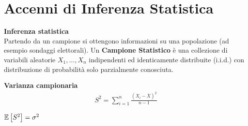 \section{Accenni di Inferenza Statistica}

\begin{defn}
    \textbf{Inferenza statistica} \\
    Partendo da un campione si ottengono informazioni su una popolazione (ad
    esempio sondaggi elettorali). Un \textbf{Campione Statistico} è una
    collezione di variabili aleatorie $X_1, \hdots, X_n$ indipendenti ed
    identicamente distribuite (i.i.d.) con distribuzione di probabilità solo
    parzialmente conosciuta.
\end{defn}

\begin{defn}
    \textbf{Varianza campionaria} \\
    \begin{equation*}
        \begin{aligned}
            S^2 = \sum_{i=1}^{n} \frac{(X_i - \overline{X})^2}{n-1}
        \end{aligned}
    \end{equation*}

    \begin{note}
        $\mathbb{E}\left[S^2\right] = \sigma^2$
    \end{note}
\end{defn}
